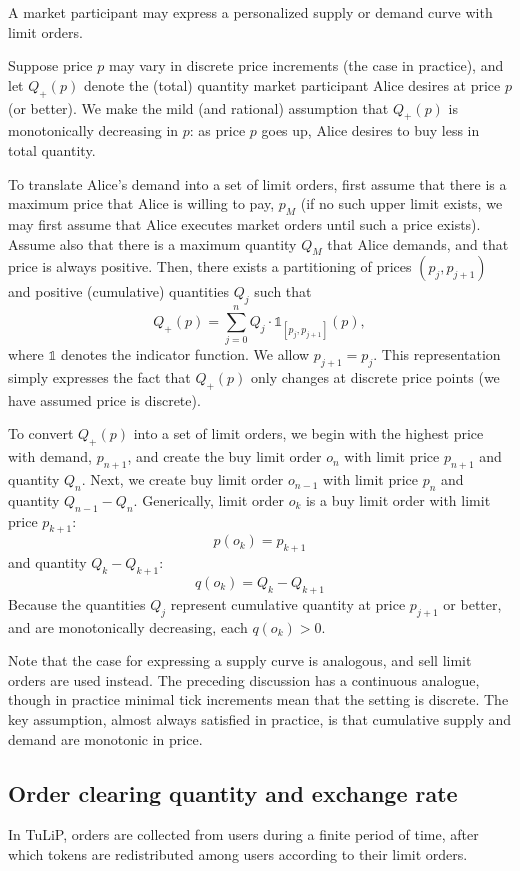 \documentclass[11pt, reqno]{amsart}
\theoremstyle{definition}
\theoremstyle{remark}
\begin{document}
A market participant may express a personalized supply or demand curve with
limit orders.

Suppose price $p$ may vary in discrete price increments (the case in practice),
and let $Q_+(p)$ denote the (total) quantity market participant Alice desires
at price $p$ (or better).  We make the mild (and rational) assumption that
$Q_+(p)$ is monotonically decreasing in $p$: as price $p$ goes up, Alice desires
to buy less in total quantity.

To translate Alice's demand into a set of limit orders, first assume that there
is a maximum price that Alice is willing to pay, $p_M$ (if no such upper limit
exists, we may first assume that Alice executes market orders until such a
price exists). Assume also that there is a maximum quantity $Q_M$ that Alice
demands, and that price is always positive. Then, there exists a partitioning
of prices $(p_j, p_{j + 1})$ and positive (cumulative) quantities $Q_j$ such
that
\[
    Q_+(p) = \sum_{j = 0}^n Q_j \cdot \mathbb{1}_{[p_j, p_{j + 1}]}(p),
\]
where $\mathbb{1}$ denotes the indicator function. We allow $p_{j + 1} = p_j$.
This representation simply expresses the fact that $Q_+(p)$ only changes at
discrete price points (we have assumed price is discrete).

To convert $Q_+(p)$ into a set of limit orders, we begin with the highest price
with demand, $p_{n + 1}$, and create the buy limit order $o_n$ with limit price
$p_{n + 1}$ and quantity $Q_n$. Next, we create buy limit order $o_{n - 1}$ with
limit price $p_n$ and quantity $Q_{n - 1} - Q_n$. Generically, limit order
$o_k$ is a buy limit order with limit price $p_{k + 1}$:
\[
    p(o_k) = p_{k + 1}
\]
and quantity $Q_k - Q_{k + 1}$:
\[
    q(o_k) = Q_k - Q_{k + 1}
\]
Because the quantities $Q_j$ represent cumulative quantity at price
$p_{j + 1}$ or better, and are monotonically decreasing, each $q(o_k) > 0$.

Note that the case for expressing a supply curve is analogous, and sell limit
orders are used instead. The preceding discussion has a continuous analogue,
though in practice minimal tick increments mean that the setting is discrete.
The key assumption, almost always satisfied in practice, is that cumulative
supply and demand are monotonic in price.

\subsection{Order clearing quantity and exchange rate}
In TuLiP, orders are collected from users during a finite period of time,
after which tokens are redistributed among users according to their limit
orders.
\end{document}
